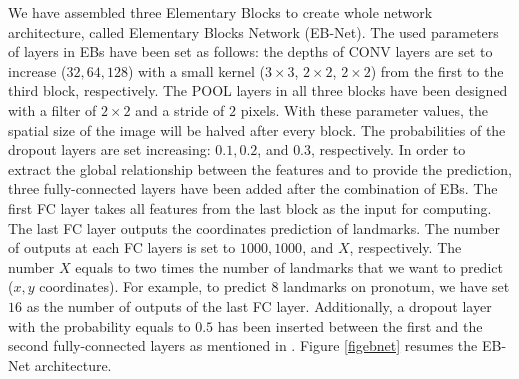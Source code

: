 \documentclass[review]{elsarticle}
\begin{document}



We have assembled three Elementary Blocks to create whole network architecture, called Elementary Blocks Network (EB-Net). The used parameters of layers in EBs have been set as follows: the depths of CONV layers are set to increase ($32, 64, 128$) with a small kernel ($3 \times 3$, $2 \times 2$, $2 \times 2$) from the first to the third block, respectively. The POOL layers in all three blocks have been designed with a filter of $2 \times 2$ and a stride of $2$ pixels. With these parameter values, the spatial size of the image will be halved after every block. The probabilities of the dropout layers are set increasing: $0.1, 0.2$, and $0.3$, respectively. In order to extract the global relationship between the features and to provide the prediction, three fully-connected layers have been added after the combination of EBs. The first FC layer takes all features from the last block as the input for computing. The last FC layer outputs the coordinates prediction of landmarks. The number of outputs at each FC layers is set to $1000, 1000$, and $X$, respectively. The number $X$ equals to two times the number of landmarks that we want to predict ($x, y$ coordinates). For example, to predict $8$ landmarks on pronotum, we have set $16$ as the number of outputs of the last FC layer. Additionally, a dropout layer with the probability equals to $0.5$ has been inserted between the first and the second fully-connected layers as mentioned in \cite{hinton2012improving}. Figure \ref{figebnet} resumes the EB-Net architecture.
\end{document}
